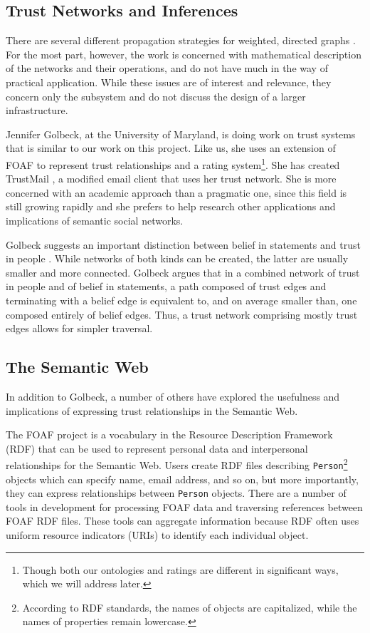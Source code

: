 \documentclass{acm_proc_article-sp}
\begin{document}
\subsection{Trust Networks and Inferences}
There are several different propagation strategies for weighted, directed graphs \citep{richardson03management} \citep{abdul-rahman:relying} \citep{guha04propagation}.  For the most part, however, the work is concerned with mathematical description of the networks and their operations, and do not have much in the way of practical application.  While these issues are of interest and relevance, they concern only the subsystem and do not discuss the design of a larger infrastructure.

Jennifer Golbeck, at the University of Maryland, is doing work on trust systems  \citep{golbeckDissertation} that is similar to our work on this project.  Like us, she uses an extension of FOAF to represent trust relationships and a rating system\footnote{Though both our ontologies and ratings are different in significant ways, which we will address later.}.  She has created TrustMail  \citep{trustMail}, a modified email client that uses her trust network.  She is more concerned with an academic approach than a pragmatic one, since this field is still growing rapidly and she prefers to help research other applications and implications of semantic social networks.

Golbeck suggests an important distinction between belief in statements and trust in people \citep{golbeck:accuracy}.  While networks of both kinds can be created, the latter are usually smaller and more connected.  Golbeck argues that in a combined network of trust in people and of belief in statements, a path composed of trust edges and terminating with a belief edge is equivalent to, and on average smaller than, one composed entirely of belief edges.  Thus, a trust network comprising mostly trust edges allows for simpler traversal.

\subsection{The Semantic Web}
In addition to Golbeck, a number of others have explored the usefulness and implications of expressing trust relationships in the Semantic Web.

\label{foaf}
The FOAF project \citep{foafProject} is a vocabulary in the Resource Description Framework (RDF) that can be used to represent personal data and interpersonal relationships for the Semantic Web.  Users create RDF files describing \texttt{Person}\footnote{According to RDF standards, the names of objects are capitalized, while the names of properties remain lowercase.} objects which can specify name, email address, and so on, but more importantly, they can express relationships between \texttt{Person} objects.  There are a number of tools in development for processing FOAF data and traversing references between FOAF RDF files.  These tools can aggregate information because RDF often uses uniform resource indicators (URIs) to identify each individual object.
\end{document}
